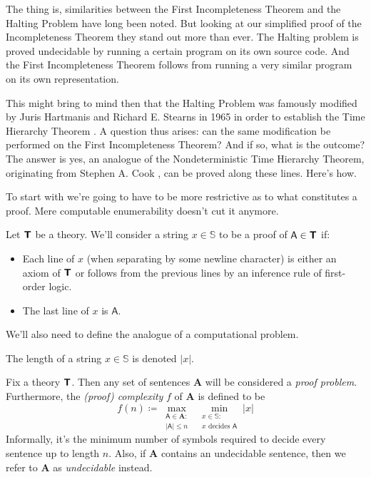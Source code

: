 \documentclass{article}
\theoremstyle{customstyle}
\newcommand{\T}{\textbf{\textsf{T}}}
\begin{document}
The thing is, similarities between the First Incompleteness Theorem and the Halting Problem have long been noted. But looking at our simplified proof of the Incompleteness Theorem they stand out more than ever. The Halting problem is proved undecidable by running a certain program on its own source code. And the First Incompleteness Theorem follows from running a very similar program on its own representation.

This might bring to mind then that the Halting Problem was famously modified by Juris Hartmanis and Richard E. Stearns in 1965 in order to establish the Time Hierarchy Theorem \cite{time-hierarchy}. A question thus arises: can the same modification be performed on the First Incompleteness Theorem? And if so, what is the outcome? The answer is yes, an analogue of the Nondeterministic Time Hierarchy Theorem, originating from Stephen A. Cook \cite{cook}, can be proved along these lines. Here's how.

To start with we're going to have to be more restrictive as to what constitutes a proof. Mere computable enumerability doesn't cut it anymore.

\begin{definition}[Proof]
  Let $\T$ be a theory. We'll consider a string $x \in \mathbb{S}$ to be a proof of $\mathsf{A} \in \T$ if:
  \begin{itemize}
    \item Each line of $x$ (when separating by some newline character) is either an axiom of $\T$ or follows from the previous lines by an inference rule of first-order logic.
    \item The last line of $x$ is $\mathsf{A}$.
  \end{itemize}
\end{definition}

We'll also need to define the analogue of a computational problem.

\begin{definition}
  The length of a string $x \in \mathbb{S}$ is denoted $\lvert x \rvert$.
\end{definition}

\begin{definition}
  Fix a theory $\T$. Then any set of sentences $\mathbf{A}$ will be considered a \emph{proof problem}. Furthermore, the \textit{(proof) complexity} $f$ of $\mathbf{A}$ is defined to be
  \[
    f(n) \coloneqq \max_{\substack{\mathsf{A} \in \mathbf{A} \colon\\ \lvert \mathsf{A} \rvert \leq n}} \; \min_{\substack{x \in \mathbb{S} \colon\\ x \text{ decides } \mathsf{A}}} \lvert x \rvert
  \]
  Informally, it's the minimum number of symbols required to decide every sentence up to length $n$. Also, if $\mathbf{A}$ contains an undecidable sentence, then we refer to $\mathbf{A}$ as \emph{undecidable} instead.
\end{definition}
\end{document}
